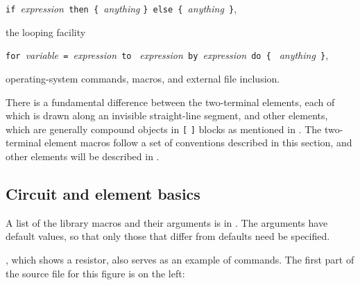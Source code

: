 \verb|if |{\sl expression}\verb| then { |{\sl anything} 
  \verb|} else { |{\sl anything}\verb| }|,

\noindent%
the looping facility

\verb|for |{\sl variable}\verb| = |{\sl expression}\verb| to |%
{\sl expression}\verb| by |{\sl expression}\verb| do { |%
{\sl anything}\verb| }|,

\noindent%
operating-system commands, \pic macros, and external file inclusion.

There is a fundamental difference between the two-terminal elements, each
of which is drawn along an invisible straight-line segment,
and other elements, which are generally compound objects
in {\tt[} {\tt]} blocks as mentioned in .
The two-terminal element macros follow a
set of conventions described in this section, and other elements will
be described in .

\subsection{Circuit and element basics\label{Basics:}}
A list of the library macros and their arguments is in
.  The arguments have default values, so that only
those that differ from defaults need be specified.

, which shows a resistor, also serves as
an example of \pic commands.
The first part of the source file for this figure is 
on the left:

